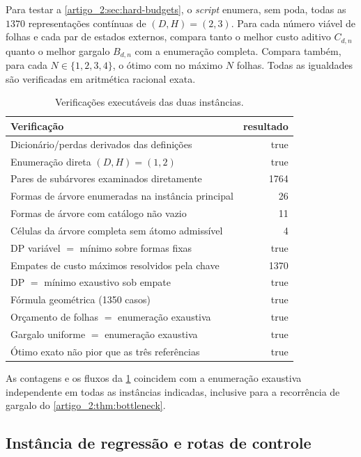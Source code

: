 \documentclass[12pt,a4paper]{article}
\theoremstyle{preciso}
\theoremstyle{definition}
\theoremstyle{preciso}
\theoremstyle{preciso}
\theoremstyle{preciso}
\theoremstyle{preciso}
\theoremstyle{definition}
\theoremstyle{preciso}
\theoremstyle{definition}
\theoremstyle{preciso}
\theoremstyle{preciso}
\theoremstyle{definition}
\begin{document}
Para testar a \cref{artigo_2:sec:hard-budgets}, o \emph{script} enumera, sem poda, todas as
$1370$ representações contínuas de $(D,H)=(2,3)$. Para cada número viável de
folhas e cada par de estados externos, compara tanto o melhor custo aditivo
$C_{d,n}$ quanto o melhor gargalo $B_{d,n}$ com a enumeração completa. Compara
também, para cada $N\in\{1,2,3,4\}$, o ótimo com no máximo $N$ folhas. Todas
as igualdades são verificadas em aritmética racional exata.

\begin{table}[t]
 \centering
 \caption{Verificações executáveis das duas instâncias.}
 \label{artigo_2:tab:dp-audit}
 \small
 \begin{tabularx}{\linewidth}{@{}Xr@{}}
\toprule
Verificação & resultado \\
\midrule
Dicionário/perdas derivados das definições & true \\
Enumeração direta $(D,H)=(1,2)$ & true \\
Pares de subárvores examinados diretamente & 1764 \\
Formas de árvore enumeradas na instância principal & 26 \\
Formas de árvore com catálogo não vazio & 11 \\
Células da árvore completa sem átomo admissível & 4 \\
DP variável $=$ mínimo sobre formas fixas & true \\
Empates de custo máximos resolvidos pela chave & 1370 \\
DP $=$ mínimo exaustivo sob empate & true \\
Fórmula geométrica (1350 casos) & true \\
Orçamento de folhas $=$ enumeração exaustiva & true \\
Gargalo uniforme $=$ enumeração exaustiva & true \\
Ótimo exato não pior que as três referências & true \\
\bottomrule
\end{tabularx}

\end{table}

As contagens e os fluxos da \cref{artigo_2:tab:dp-audit} coincidem com a enumeração
exaustiva independente em todas as instâncias indicadas, inclusive para a
recorrência de gargalo do \cref{artigo_2:thm:bottleneck}.

\subsection{Instância de regressão e rotas de controle}
\end{document}
